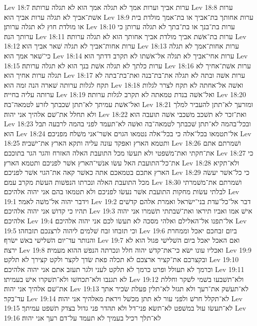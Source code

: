 Lev 18:7  ערות אביך וערות אמך לא תגלה אמך הוא לא תגלה ערותה׃
Lev 18:8  ערות אשׁת־אביך לא תגלה ערות אביך הוא׃
Lev 18:9  ערות אחותך בת־אביך או בת־אמך מולדת בית או מולדת חוץ לא תגלה ערותן׃
Lev 18:10  ערות בת־בנך או בת־בתך לא תגלה ערותן כי ערותך הנה׃
Lev 18:11  ערות בת־אשׁת אביך מולדת אביך אחותך הוא לא תגלה ערותה׃
Lev 18:12  ערות אחות־אביך לא תגלה שׁאר אביך הוא׃
Lev 18:13  ערות אחות־אמך לא תגלה כי־שׁאר אמך הוא׃
Lev 18:14  ערות אחי־אביך לא תגלה אל־אשׁתו לא תקרב דדתך הוא׃
Lev 18:15  ערות כלתך לא תגלה אשׁת בנך הוא לא תגלה ערותה׃
Lev 18:16  ערות אשׁת־אחיך לא תגלה ערות אחיך הוא׃
Lev 18:17  ערות אשׁה ובתה לא תגלה את־בת־בנה ואת־בת־בתה לא תקח לגלות ערותה שׁארה הנה זמה הוא׃
Lev 18:18  ואשׁה אל־אחתה לא תקח לצרר לגלות ערותה עליה בחייה׃
Lev 18:19  ואל־אשׁה בנדת טמאתה לא תקרב לגלות ערותה׃
Lev 18:20  ואל־אשׁת עמיתך לא־תתן שׁכבתך לזרע לטמאה־בה׃
Lev 18:21  ומזרעך לא־תתן להעביר למלך ולא תחלל את־שׁם אלהיך אני יהוה׃
Lev 18:22  ואת־זכר לא תשׁכב משׁכבי אשׁה תועבה הוא׃
Lev 18:23  ובכל־בהמה לא־תתן שׁכבתך לטמאה־בה ואשׁה לא־תעמד לפני בהמה לרבעה תבל הוא׃
Lev 18:24  אל־תטמאו בכל־אלה כי בכל־אלה נטמאו הגוים אשׁר־אני משׁלח מפניכם׃
Lev 18:25  ותטמא הארץ ואפקד עונה עליה ותקא הארץ את־ישׁביה׃
Lev 18:26  ושׁמרתם אתם את־חקתי ואת־משׁפטי ולא תעשׂו מכל התועבת האלה האזרח והגר הגר בתוככם׃
Lev 18:27  כי את־כל־התועבת האל עשׂו אנשׁי־הארץ אשׁר לפניכם ותטמא הארץ׃
Lev 18:28  ולא־תקיא הארץ אתכם בטמאכם אתה כאשׁר קאה את־הגוי אשׁר לפניכם׃
Lev 18:29  כי כל־אשׁר יעשׂה מכל התועבת האלה ונכרתו הנפשׁות העשׂת מקרב עמם׃
Lev 18:30  ושׁמרתם את־משׁמרתי לבלתי עשׂות מחקות התועבת אשׁר נעשׂו לפניכם ולא תטמאו בהם אני יהוה אלהיכם׃
Lev 19:1  וידבר יהוה אל־משׁה לאמר׃
Lev 19:2  דבר אל־כל־עדת בני־ישׂראל ואמרת אלהם קדשׁים תהיו כי קדושׁ אני יהוה אלהיכם׃
Lev 19:3  אישׁ אמו ואביו תיראו ואת־שׁבתתי תשׁמרו אני יהוה אלהיכם׃
Lev 19:4  אל־תפנו אל־האלילם ואלהי מסכה לא תעשׂו לכם אני יהוה אלהיכם׃
Lev 19:5  וכי תזבחו זבח שׁלמים ליהוה לרצנכם תזבחהו׃
Lev 19:6  ביום זבחכם יאכל וממחרת והנותר עד־יום השׁלישׁי באשׁ ישׂרף׃
Lev 19:7  ואם האכל יאכל ביום השׁלישׁי פגול הוא לא ירצה׃
Lev 19:8  ואכליו עונו ישׂא כי־את־קדשׁ יהוה חלל ונכרתה הנפשׁ ההוא מעמיה׃
Lev 19:9  ובקצרכם את־קציר ארצכם לא תכלה פאת שׂדך לקצר ולקט קצירך לא תלקט׃
Lev 19:10  וכרמך לא תעולל ופרט כרמך לא תלקט לעני ולגר תעזב אתם אני יהוה אלהיכם׃
Lev 19:11  לא תגנבו ולא־תכחשׁו ולא־תשׁקרו אישׁ בעמיתו׃
Lev 19:12  ולא־תשׁבעו בשׁמי לשׁקר וחללת את־שׁם אלהיך אני יהוה׃
Lev 19:13  לא־תעשׁק את־רעך ולא תגזל לא־תלין פעלת שׂכיר אתך עד־בקר׃
Lev 19:14  לא־תקלל חרשׁ ולפני עור לא תתן מכשׁל ויראת מאלהיך אני יהוה׃
Lev 19:15  לא־תעשׂו עול במשׁפט לא־תשׂא פני־דל ולא תהדר פני גדול בצדק תשׁפט עמיתך׃
Lev 19:16  לא־תלך רכיל בעמיך לא תעמד על־דם רעך אני יהוה׃
